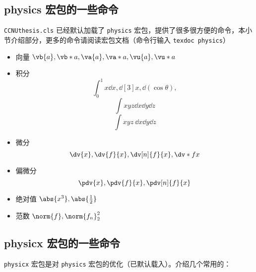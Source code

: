 \subsection{physics 宏包的一些命令}

\verb|CCNUthesis.cls| 已经默认加载了 \verb|physics| 宏包，提供了很多很方便的命令，本小节介绍部分，更多的命令请阅读宏包文档（命令行输入 \verb|texdoc physics|）

\begin{itemize}
  \item 向量 $\vb{a}, \vb*{a}, \va{a}, \va*{a}, \vu{a}, \vu*{a}$
  \item 积分
    \[
      \int_{0}^{1} x \dd{x},
      \dd[3]{x}, \dd(\cos\theta),
    \]
    \[
      \int xyz \dd{x} \dd{y} \dd{z}
    \]
    \[
      \int xyz \ \dd x \dd y \dd z    
    \]
  \item 微分
    \[
      \dv{x}, \dv{f}{x}, \dv[n]{f}{x}, \dv*{f}{x}
    \]
  \item 偏微分
    \[
      \pdv{x}, \pdv{f}{x}, \pdv[n]{f}{x}
    \]
  \item 绝对值 $\abs{x^3}, \abs{\frac{1}{2}}$
  \item 范数 $\norm{f}, \norm{f_n}_{2}^{2}$
\end{itemize}



\subsection{physicx 宏包的一些命令}

\verb|physicx| 宏包是对 \verb|physics| 宏包的优化（已默认载入）。介绍几个常用的：

